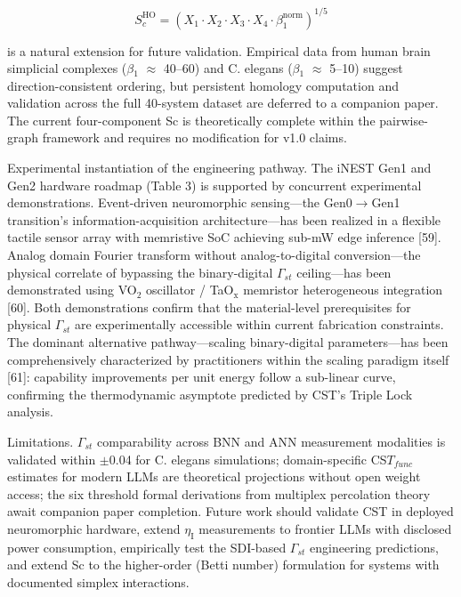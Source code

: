 \documentclass[a4paper,12pt]{article}
\providecommand{\textsubscript}[1]{\ensuremath{_{\text{#1}}}}
\begin{document}
\begin{equation}
S_c^{\text{HO}} = (X_1 \cdot X_2 \cdot X_3 \cdot X_4 \cdot \beta_1^{\text{norm}})^{1/5}
\end{equation}


is a natural extension for future validation. Empirical data from human brain simplicial complexes ($\beta$\textsubscript{1} $\approx$ 40--60) and C. elegans ($\beta$\textsubscript{1} $\approx$ 5--10) suggest direction-consistent ordering, but persistent homology computation and validation across the full 40-system dataset are deferred to a companion paper. The current four-component Sc is theoretically complete within the pairwise-graph framework and requires no modification for v1.0 claims.


Experimental instantiation of the engineering pathway.
The iNEST Gen1 and Gen2 hardware roadmap (Table 3) is supported by concurrent experimental demonstrations.
Event-driven neuromorphic sensing---the Gen0$\rightarrow$Gen1 transition's information-acquisition architecture---has been realized in a flexible tactile sensor array with memristive SoC achieving sub-mW edge inference [59].
Analog domain Fourier transform without analog-to-digital conversion---the physical correlate of bypassing the binary-digital $\Gamma_{st}$ ceiling---has been demonstrated using VO\textsubscript{2} oscillator / TaO\textsubscript{x} memristor heterogeneous integration [60].
Both demonstrations confirm that the material-level prerequisites for physical $\Gamma_{st}$ are experimentally accessible within current fabrication constraints.
The dominant alternative pathway---scaling binary-digital parameters---has been comprehensively characterized by practitioners within the scaling paradigm itself [61]: capability improvements per unit energy follow a sub-linear curve, confirming the thermodynamic asymptote predicted by CST's Triple Lock analysis.


Limitations. $\Gamma_{st}$ comparability across BNN and ANN measurement modalities is validated within $\pm$0.04 for C. elegans simulations; domain-specific CS$T_{func}$ estimates for modern LLMs are theoretical projections without open weight access; the six threshold formal derivations from multiplex percolation theory await companion paper completion.
Future work should validate CST in deployed neuromorphic hardware, extend $\eta_{\text{I}}$ measurements to frontier LLMs with disclosed power consumption, empirically test the SDI-based $\Gamma_{st}$ engineering predictions, and extend Sc to the higher-order (Betti number) formulation for systems with documented simplex interactions.
\end{document}
